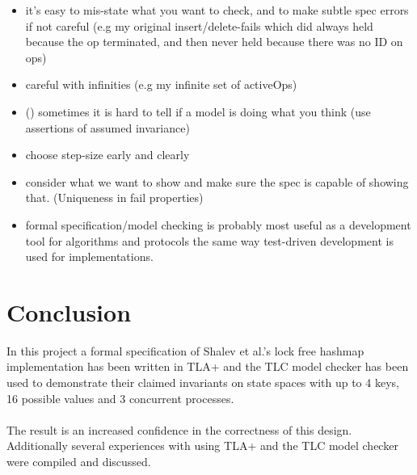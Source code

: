\documentclass{uit-thesis}
\begin{document}
\begin{itemize}
    \item \checkmark it's easy to mis-state what you want to check, and to make subtle spec errors if not careful (e.g my original insert/delete-fails which did always held because the op terminated, and then never held because there was no ID on ops)
    \item \checkmark careful with infinities (e.g my infinite set of activeOps)
    \item (\checkmark) sometimes it is hard to tell if a model is doing what you think (use assertions of assumed invariance)
    \item \checkmark choose step-size early and clearly
    \item \checkmark consider what we want to show and make sure the spec is capable of showing that. (Uniqueness in fail properties)
    \item formal specification/model checking is probably most useful as a development tool for algorithms and protocols the same way test-driven development is used for implementations.
\end{itemize}
\chapter{Conclusion}
In this project a formal specification of Shalev et al.'s lock free hashmap implementation has been written in TLA+ and the TLC model checker has been used to demonstrate their claimed invariants on state spaces with up to 4 keys, 16 possible values and 3 concurrent processes.
\\\\
The result is an increased confidence in the correctness of this design. Additionally several experiences with using TLA+ and the TLC model checker were compiled and discussed.
\backmatter
\printbibliography{}
\end{document}
